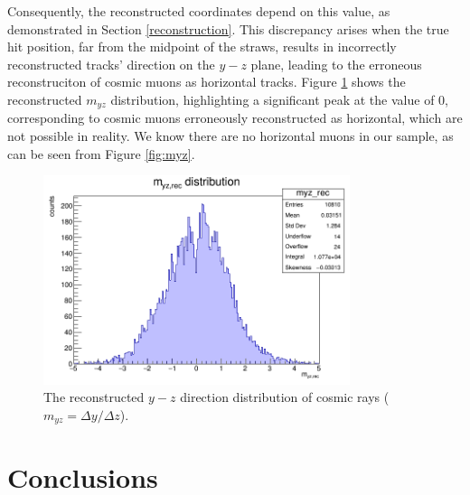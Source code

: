 {Consequently, 
the reconstructed coordinates depend on this 
value, as demonstrated in Section \ref{reconstruction}. 
This discrepancy arises when the true hit 
position, far from the midpoint of the straws, 
results in incorrectly reconstructed tracks'
direction on the $y-z$ plane, leading to the erroneous 
reconstruciton of cosmic muons as horizontal tracks.
Figure \ref{fig:myzrec} shows the 
reconstructed $m_{yz}$ distribution, highlighting 
a significant peak at the value of 0, 
corresponding to cosmic muons erroneously 
reconstructed as horizontal, which 
are not possible in reality. We know there are 
no horizontal muons in our sample, as can be seen 
from Figure \ref{fig:myz}.


\begin{figure}[!h]
    \centering
    \includegraphics[width=0.8\textwidth]{figures/png/myz_rec.png}
    \caption[The reconstructed $y-z$ direction distribution of cosmic rays.]{The reconstructed $y-z$ direction distribution of cosmic rays ($m_{yz}=\Delta y /\Delta z$).}
    \label{fig:myzrec}
  \end{figure}
  
  \section{Conclusions}


}
